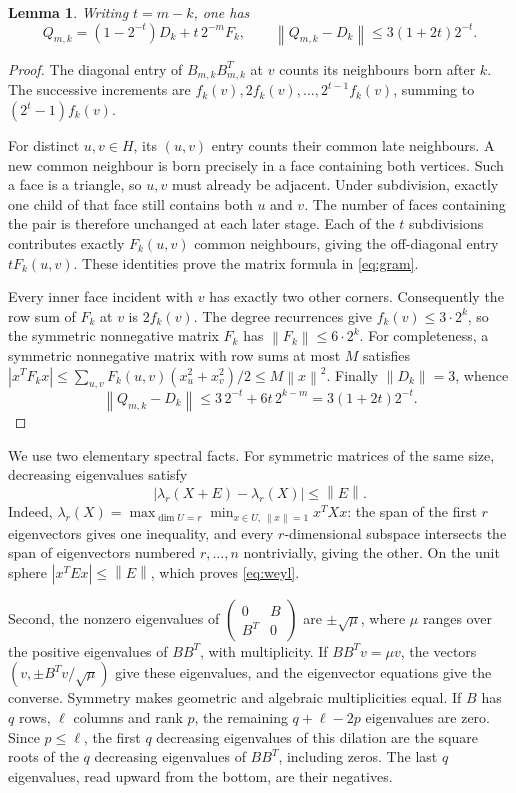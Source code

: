 \documentclass[11pt]{article}
\newtheorem{lemma}[theorem]{Lemma}
\newcommand{\norm}[1]{\left\lVert#1\right\rVert}
\begin{document}
\begin{lemma}\label{lem:gram}
Writing $t=m-k$, one has
\begin{equation}\label{eq:gram}
Q_{m,k}=(1-2^{-t})D_k+t\,2^{-m}F_k,
\qquad
\norm{Q_{m,k}-D_k}\le3(1+2t)2^{-t}.
\end{equation}
\end{lemma}
\begin{proof}
The diagonal entry of $B_{m,k}B_{m,k}^T$ at $v$ counts its neighbours
born after $k$. The successive increments are
$f_k(v),2f_k(v),\ldots,2^{t-1}f_k(v)$, summing to
$(2^t-1)f_k(v)$.

For distinct $u,v\in H$, its $(u,v)$ entry counts their common late
neighbours. A new common neighbour is born precisely in a face
containing both vertices. Such a face is a triangle, so $u,v$ must
already be adjacent. Under subdivision, exactly one child of that face
still contains both $u$ and $v$. The number of faces containing the
pair is therefore unchanged at each later stage. Each of the $t$
subdivisions contributes exactly $F_k(u,v)$ common neighbours, giving
the off-diagonal entry $tF_k(u,v)$. These identities prove the matrix
formula in \eqref{eq:gram}.

Every inner face incident with $v$ has exactly two other corners.
Consequently the row sum of $F_k$ at $v$ is $2f_k(v)$.
The degree recurrences give $f_k(v)\le3\cdot2^k$, so the symmetric
nonnegative matrix $F_k$ has $\norm{F_k}\le6\cdot2^k$.
For completeness, a symmetric nonnegative matrix with row sums at most
$M$ satisfies
$|x^TF_kx|\le\sum_{u,v}F_k(u,v)(x_u^2+x_v^2)/2\le M\norm{x}^2$.
Finally $\norm{D_k}=3$, whence
\[
\norm{Q_{m,k}-D_k}\le3\,2^{-t}+6t\,2^{k-m}
=3(1+2t)2^{-t}.
\]
\end{proof}

We use two elementary spectral facts. For symmetric matrices of the same
size, decreasing eigenvalues satisfy
\begin{equation}\label{eq:weyl}
|\lambda_r(X+E)-\lambda_r(X)|\le\norm{E}.
\end{equation}
Indeed,
$\lambda_r(X)=\max_{\dim U=r}\min_{x\in U,\,\norm{x}=1}x^TXx$:
the span of the first $r$ eigenvectors gives one inequality, and every
$r$-dimensional subspace intersects the span of eigenvectors numbered
$r,\ldots,n$ nontrivially, giving the other.
On the unit sphere $|x^TEx|\le\norm{E}$, which proves
\eqref{eq:weyl}.

Second, the nonzero eigenvalues of
$\left(\begin{smallmatrix}0&B\\B^T&0\end{smallmatrix}\right)$ are
$\pm\sqrt\mu$, where $\mu$ ranges over the positive eigenvalues of
$BB^T$, with multiplicity. If $BB^Tv=\mu v$, the vectors
$(v,\pm B^Tv/\sqrt\mu)$ give these eigenvalues, and the eigenvector
equations give the converse. Symmetry makes geometric and algebraic
multiplicities equal. If $B$ has $q$ rows, $\ell$ columns and rank $p$,
the remaining $q+\ell-2p$ eigenvalues are zero. Since $p\le\ell$, the
first $q$ decreasing eigenvalues of this dilation are the square roots
of the $q$ decreasing eigenvalues of $BB^T$, including zeros.
The last $q$ eigenvalues, read upward from the bottom, are their
negatives.
\end{document}

